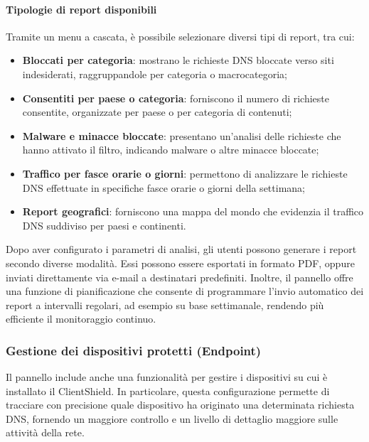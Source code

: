 \paragraph{Tipologie di report disponibili}
Tramite un menu a cascata, è possibile selezionare diversi tipi di report, tra cui:
\begin{itemize}
  \item \textbf{Bloccati per categoria}: mostrano le richieste DNS bloccate verso siti indesiderati, raggruppandole per categoria o macrocategoria;
  \item \textbf{Consentiti per paese o categoria}: forniscono il numero di richieste consentite, organizzate per paese o per categoria di contenuti;
  \item \textbf{Malware e minacce bloccate}: presentano un’analisi delle richieste che hanno attivato il filtro, indicando malware o altre minacce bloccate;
  \item \textbf{Traffico per fasce orarie o giorni}: permettono di analizzare le richieste DNS effettuate in specifiche fasce orarie o giorni della settimana;
  \item \textbf{Report geografici}: forniscono una mappa del mondo che evidenzia il traffico DNS suddiviso per paesi e continenti.
\end{itemize}

Dopo aver configurato i parametri di analisi, gli utenti possono generare i report secondo diverse modalità. Essi possono essere esportati in formato PDF, oppure inviati direttamente via e-mail a destinatari predefiniti. Inoltre, il pannello offre una funzione di pianificazione che consente di programmare l'invio automatico dei report a intervalli regolari, ad esempio su base settimanale, rendendo più efficiente il monitoraggio continuo.

\subsubsection{Gestione dei dispositivi protetti (Endpoint)}
Il pannello include anche una funzionalità per gestire i dispositivi su cui è installato il ClientShield. In particolare, questa configurazione permette di tracciare con precisione quale dispositivo ha originato una determinata richiesta DNS, fornendo un maggiore controllo e un livello di dettaglio maggiore sulle attività della rete.

